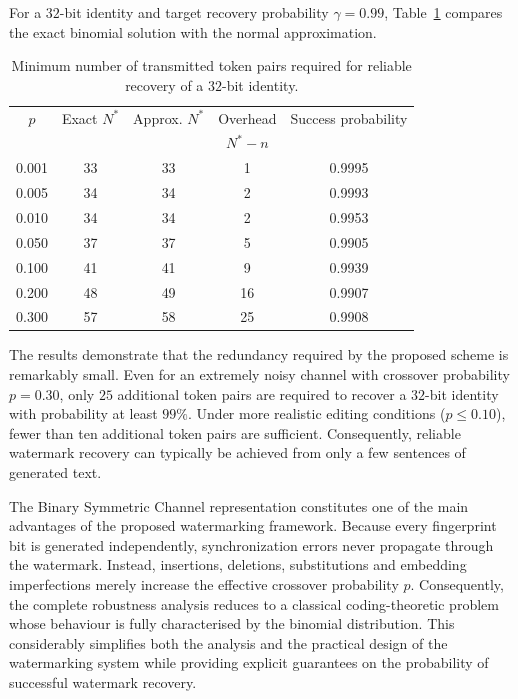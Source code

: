 \documentclass[a4paper,11pt]{llncs}
\begin{document}
{\small
\begin{example}

For a $32$-bit identity and target recovery probability
$\gamma=0.99$, Table~\ref{tab:bsc} compares the exact binomial solution
with the normal approximation.
%
\begin{table}[ht]
\centering
\caption{Minimum number of transmitted token pairs required for reliable
recovery of a $32$-bit identity.}
\label{tab:bsc}
\begin{tabular}{ccccc}
\hline
$p$ & Exact $N^*$ & Approx. $N^*$ & Overhead & Success probability\\
&&&$N^*-n$&   \\
\hline
0.001 & 33 & 33 & 1  & 0.9995\\
0.005 & 34 & 34 & 2  & 0.9993\\
0.010 & 34 & 34 & 2  & 0.9953\\
0.050 & 37 & 37 & 5  & 0.9905\\
0.100 & 41 & 41 & 9  & 0.9939\\
0.200 & 48 & 49 &16  & 0.9907\\
0.300 & 57 & 58 &25  & 0.9908\\
\hline
\end{tabular}
\end{table}
%
The results demonstrate that the redundancy required by the proposed
scheme is remarkably small. Even for an extremely noisy channel with
crossover probability $p=0.30$, only $25$ additional token pairs are
required to recover a $32$-bit identity with probability at least
$99\%$. Under more realistic editing conditions ($p \leq 0.10$), fewer than
ten additional token pairs are sufficient. Consequently, reliable
watermark recovery can typically be achieved from only a few sentences of
generated text.
\end{example}
}


The Binary Symmetric Channel representation constitutes one of the main
advantages of the proposed watermarking framework. Because every
fingerprint bit is generated independently, synchronization errors never
propagate through the watermark. Instead, insertions, deletions,
substitutions and embedding imperfections merely increase the effective
crossover probability $p$.
%
Consequently, the complete robustness analysis reduces to a classical
coding-theoretic problem whose behaviour is fully characterised by the
binomial distribution. This considerably simplifies both the analysis
and the practical design of the watermarking system while providing
explicit guarantees on the probability of successful watermark recovery.
\end{document}
